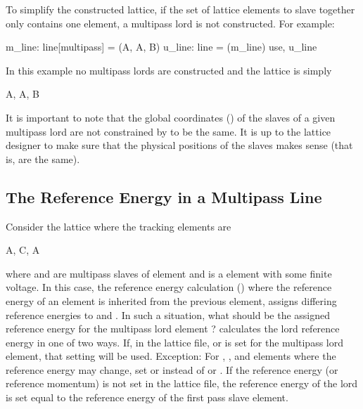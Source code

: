 To simplify the constructed lattice, if the set of lattice elements to slave together only contains
one element, a multipass lord is not constructed. For example:
\begin{example}
  m_line: line[multipass] = (A, A, B)
  u_line: line = (m_line)
  use, u_line
\end{example}
In this example no multipass lords are constructed and the lattice is simply
\begin{example}
  A, A, B
\end{example}

It is important to note that the global coordinates () of the slaves of a given
multipass lord are not constrained by \bmad to be the same. It is up to the lattice designer to make
sure that the physical positions of the slaves makes sense (that is, are the same).

\subsection{The Reference Energy in a Multipass Line}
\label{s:ref.e.multi}

Consider the lattice where the tracking elements are
\begin{example}
  A, C, A
\end{example}
where  and  are multipass slaves of element  and  is a 
element with some finite voltage. In this case, the reference energy calculation ()
where the reference energy of an element is inherited from the previous element, assigns differing
reference energies to  and . In such a situation, what should be the assigned
reference energy for the multipass lord element ? \bmad calculates the lord reference energy
in one of two ways. If, in the lattice file,  or  is set for the multipass lord
element, that setting will be used. Exception: For , , and 
elements where the reference energy may change, set  or  instead of
 or .  If the reference energy (or reference momentum) is not set in the lattice
file, the reference energy of the lord is set equal to the reference energy of the first pass slave
element.


